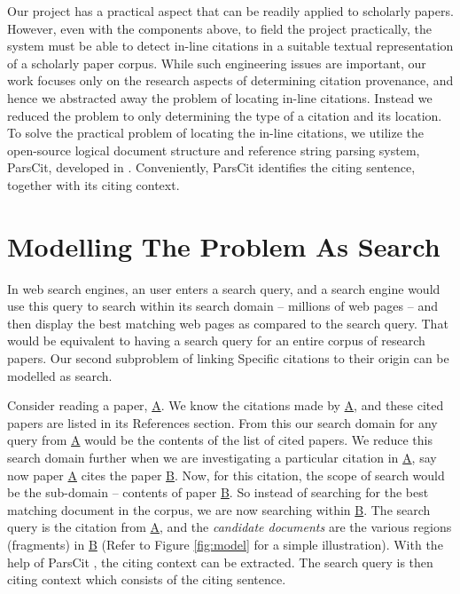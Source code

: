 Our project has a practical aspect that can be readily applied to scholarly papers.  However, even with the components above, to field the project practically, the system must be able to detect in-line citations in a suitable textual representation of a scholarly paper corpus. 
While such engineering issues are important, our work focuses only on the research aspects of determining citation provenance, and hence we abstracted away the problem of locating in-line citations.  Instead we reduced the problem to only determining the type of a citation and its location. To solve the practical problem of locating the in-line citations, we utilize the open-source logical document structure and reference string parsing system, ParsCit, developed in . Conveniently, ParsCit identifies the citing sentence, together with its citing context.

\section{Modelling The Problem As Search}
In web search engines, an user enters a search query, and a search engine would use this query to search within its search domain -- millions of web pages -- and then display the best matching web pages as compared to the search query. 
That would be equivalent to having a search query for an entire corpus of research papers. Our second subproblem of linking Specific citations to their origin can be modelled as search.

Consider reading a paper, \url{A}. We know the citations made by \url{A}, and these cited papers are listed in its References section. From this our search domain for any query from \url{A} would be the contents of the list of cited papers. We reduce this search domain further when we are investigating a particular citation in \url{A}, say now paper \url{A} cites the paper \url{B}. Now, for this citation, the scope of search would be the sub-domain -- contents of paper \url{B}. So instead of searching for the best matching document in the corpus, we are now searching within \url{B}. The search query is the citation from \url{A}, and the {\it candidate documents} are the various regions (fragments) in \url{B} (Refer to Figure \ref{fig:model} for a simple illustration). With the help of ParsCit \cite{parscit}, the citing context can be extracted. The search query is then citing context which consists of the citing sentence.

